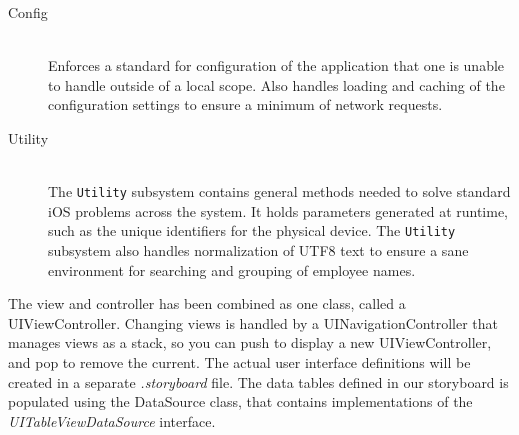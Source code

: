 \begin{description}
    \item[Config] \hfill \\
        Enforces a standard for configuration of the application that one is unable to handle
        outside of a local scope. Also handles loading and caching of the configuration settings to ensure
        a minimum of network requests.

    \item[Utility] \hfill \\
        The \texttt{Utility} subsystem contains general methods needed to solve standard iOS problems
        across the system. It holds parameters generated at runtime, such as the unique identifiers for
        the physical device. The \texttt{Utility} subsystem also handles normalization of UTF8 text to ensure
        a sane environment for searching and grouping of employee names.

\end{description}

The view and controller has been combined as one class, called a UIViewController.
Changing views is handled by a UINavigationController that manages views as a stack, so you can push
to display a new UIViewController, and pop to remove the current. The actual user interface definitions
will be created in a separate \textit{.storyboard} file. The data tables defined in our storyboard is
populated using the DataSource class, that contains implementations of the \textit{UITableViewDataSource}
interface.


